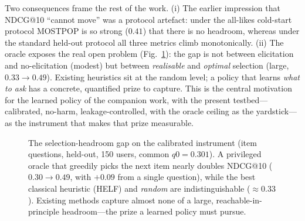 Two consequences frame the rest of the work. (i) The earlier impression that NDCG@10 ``cannot move'' was a protocol
artefact: under the all-likes cold-start protocol MOSTPOP is so strong ($0.41$) that there is no headroom, whereas
under the standard held-out protocol all three metrics climb monotonically. (ii) The oracle exposes the real open
problem (Fig.~\ref{fig:headroom}): the gap is not between elicitation and no-elicitation (modest) but between
\emph{realisable} and \emph{optimal} selection (large, $0.33\!\to\!0.49$). Existing heuristics sit at the random
level; a policy that learns \emph{what to ask} has a concrete, quantified prize to capture. This is the central
motivation for the learned policy of the companion work, with the present testbed---calibrated, no-harm,
leakage-controlled, with the oracle ceiling as the yardstick---as the instrument that makes that prize measurable.

\begin{figure}[h]\centering
{}
\caption{The selection-headroom gap on the calibrated instrument (item questions, held-out, 150 users, common
$q0=0.301$). A privileged oracle that greedily picks the next item nearly doubles NDCG@10 ($0.30\!\to\!0.49$, with
$+0.09$ from a single question), while the best classical heuristic (HELF) and \emph{random} are indistinguishable
($\approx0.33$). Existing methods capture almost none of a large, reachable-in-principle headroom---the prize a
learned policy must pursue.}
\label{fig:headroom}
\end{figure}

